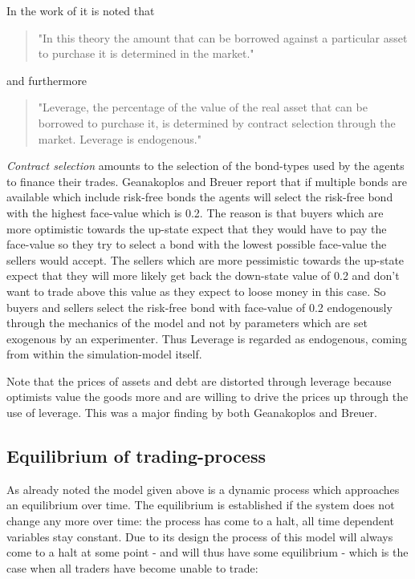 \documentclass[../Bachelorarbeit.tex]{subfiles}
\begin{document}
\medskip
In the work of \cite{Breuer2015} it is noted that 
\begin{quote}
"In this theory the amount that can be borrowed against a particular asset to purchase it is determined in the market."
\end{quote}

and furthermore

\begin{quote}
"Leverage, the percentage of the value of the real asset that can be borrowed to purchase it, is determined by contract selection through the market. Leverage is endogenous."
\end{quote}

\textit{Contract selection} amounts to the selection of the bond-types used by the agents to finance their trades. Geanakoplos and Breuer report that if multiple bonds are available which include risk-free bonds the agents will select the risk-free bond with the highest face-value which is 0.2. The reason is that buyers which are more optimistic towards the up-state expect that they would have to pay the face-value so they try to select a bond with the lowest possible face-value the sellers would accept. The sellers which are more pessimistic towards the up-state expect that they will more likely get back the down-state value of 0.2 and don't want to trade above this value as they expect to loose money in this case. So buyers and sellers select the risk-free bond with face-value of 0.2 endogenously through the mechanics of the model and not by parameters which are set exogenous by an experimenter. Thus Leverage is regarded as endogenous, coming from within the simulation-model itself.

\medskip

Note that the prices of assets and debt are distorted through leverage because optimists value the goods more and are willing to drive the prices up through the use of leverage. This was a major finding by both Geanakoplos and Breuer.

\subsection{Equilibrium of trading-process}
As already noted the model given above is a dynamic process which approaches an equilibrium over time. The equilibrium is established if the system does not change any more over time: the process has come to a halt, all time dependent variables stay constant. Due to its design the process of this model will always come to a halt at some point - and will thus have some equilibrium - which is the case when all traders have become unable to trade:
\end{document}
